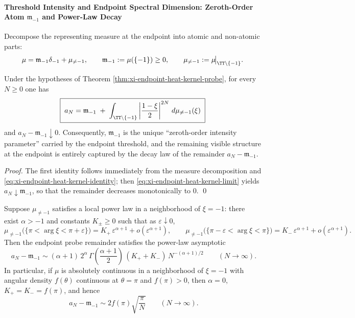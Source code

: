 \paragraph{Threshold Intensity and Endpoint Spectral Dimension: Zeroth-Order Atom \texorpdfstring{$\mathfrak m_{-1}$}{m(-1)} and Power-Law Decay}
Decompose the representing measure at the endpoint into atomic and non-atomic parts:
\[
\mu=\mathfrak m_{-1}\delta_{-1}+\mu_{\neq -1},
\qquad
\mathfrak m_{-1}:=\mu(\{-1\})\ge 0,
\qquad
\mu_{\neq -1}:=\mu\!\big|_{\TT\setminus\{-1\}}.
\]

\begin{corollary}\label{cor:xi-endpoint-atom-separation}
Under the hypotheses of Theorem \ref{thm:xi-endpoint-heat-kernel-probe}, for every \(N\ge 0\) one has
\[
\boxed{\;
a_N
=\mathfrak m_{-1}
\;+\;
\int_{\TT\setminus\{-1\}}\left|\frac{1-\xi}{2}\right|^{2N}\,d\mu_{\neq -1}(\xi)\;}
\]
and \(a_N-\mathfrak m_{-1}\downarrow 0\).
Consequently, \(\mathfrak m_{-1}\) is the unique ``zeroth-order intensity parameter'' carried by the endpoint threshold, and the remaining visible structure at the endpoint is entirely captured by the decay law of the remainder \(a_N-\mathfrak m_{-1}\).
\end{corollary}

\begin{proof}
The first identity follows immediately from the measure decomposition and \eqref{eq:xi-endpoint-heat-kernel-identity}; then \eqref{eq:xi-endpoint-heat-kernel-limit} yields \(a_N\downarrow \mathfrak m_{-1}\), so that the remainder decreases monotonically to \(0\). \qed
\end{proof}

\begin{theorem}\label{thm:xi-endpoint-spectral-dimension-laplace}
Suppose \(\mu_{\neq -1}\) satisfies a local power law in a neighborhood of \(\xi=-1\): there exist \(\alpha>-1\) and constants \(K_\pm\ge 0\) such that as \(\varepsilon\downarrow 0\),
\[
\mu_{\neq -1}\bigl(\{\pi<\arg\xi<\pi+\varepsilon\}\bigr)
=K_+\,\varepsilon^{\alpha+1}+o(\varepsilon^{\alpha+1}),
\qquad
\mu_{\neq -1}\bigl(\{\pi-\varepsilon<\arg\xi<\pi\}\bigr)
=K_-\,\varepsilon^{\alpha+1}+o(\varepsilon^{\alpha+1}).
\]
Then the endpoint probe remainder satisfies the power-law asymptotic
\begin{equation}\label{eq:xi-endpoint-laplace-asymptotic}
\boxed{\;
a_N-\mathfrak m_{-1}
\sim
(\alpha+1)\,2^{\alpha}\,
\Gamma\!\left(\frac{\alpha+1}{2}\right)\,
(K_++K_-)\,N^{-(\alpha+1)/2}\qquad(N\to\infty).}
\end{equation}
In particular, if \(\mu\) is absolutely continuous in a neighborhood of \(\xi=-1\) with angular density \(f(\theta)\) continuous at \(\theta=\pi\) and \(f(\pi)>0\), then \(\alpha=0\), \(K_+=K_-=f(\pi)\), and hence
\[
\boxed{\;
a_N-\mathfrak m_{-1}\sim 2f(\pi)\sqrt{\frac{\pi}{N}}\qquad(N\to\infty).}
\]
\end{theorem}

